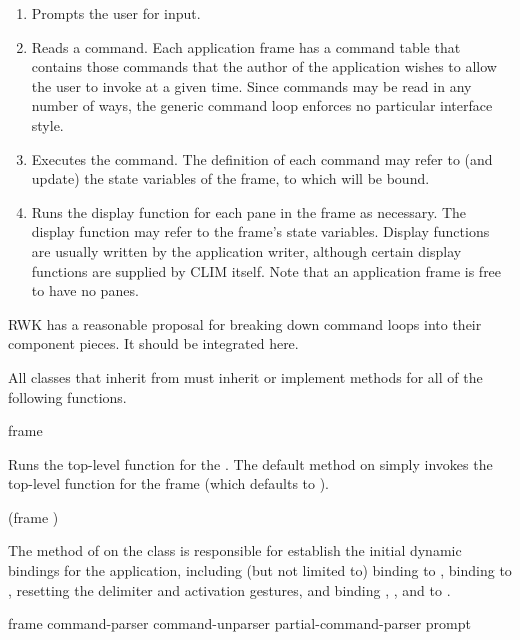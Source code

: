 \begin{enumerate}
\item Prompts the user for input.

\item Reads a command.  Each application frame has a command table that contains
those commands that the author of the application wishes to allow the user to
invoke at a given time.  Since commands may be read in any number of ways, the
generic command loop enforces no particular interface style.

\item Executes the command.  The definition of each command may refer to (and
update) the state variables of the frame, to which  will
be bound.

\item Runs the display function for each pane in the frame as necessary.  The
display function may refer to the frame's state variables.  Display functions
are usually written by the application writer, although certain display
functions are supplied by CLIM itself.  Note that an application frame is free
to have no panes.
\end{enumerate}


 {RWK has a reasonable proposal for breaking down command loops into
their component pieces.  It should be integrated here.}

All classes that inherit from  must inherit or implement
methods for all of the following functions.


 {frame \key \allow}

Runs the top-level function for the  .  The default
method on  simply invokes the top-level function for the
frame (which defaults to ).

 {(frame ) \key}

The  method of  on the
 class is responsible for establish the initial dynamic
bindings for the application, including (but not limited to) binding
 to , binding  to
, resetting the delimiter and activation gestures, and binding
, , and
 to .


 {frame \key command-parser command-unparser 
                                                  partial-command-parser
                                                  prompt}

